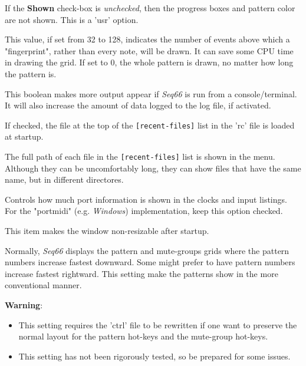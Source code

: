    If the \textbf{Shown} check-box
   is \textsl{unchecked}, then the progress boxes and pattern color are not
   shown.
   This is a 'usr' option.

   This value, if set from 32 to 128, indicates the number of events above
   which a "fingerprint", rather than every note, will be drawn.  It can
   save some CPU time in drawing the grid.  If set to 0, the whole
   pattern is drawn, no matter how long the pattern is.

   This boolean makes more output appear if \textsl{Seq66} is run from a
   console/terminal. It will also increase the amount of data logged to the log
   file, if activated.

   If checked, the file at the top of the \texttt{[recent-files]}
   list in the 'rc' file is loaded at startup.

   The full path of each file in the \texttt{[recent-files]} list
   is shown in the menu.  Although they can be uncomfortably long, they can
   show files that have the same name, but in different directores.

   Controls how much port information is shown in the clocks and input
   listings.  For the "portmidi" (e.g. \textsl{Windows})
   implementation, keep this option checked.

   This item makes the window non-resizable after startup.

   Normally, \textsl{Seq66} displays the pattern and mute-groups grids
   where the pattern numbers increase fastest downward.
   Some might prefer to have pattern numbers increase fastest rightward.
   This setting make the patterns show in the more conventional manner.

   \textbf{Warning}:

      \begin{itemize}
         \item This setting requires the 'ctrl' file to be rewritten
            if one want to preserve the normal layout for the pattern hot-keys
            and the mute-group hot-keys.
         \item This setting has not been rigorously tested, so be prepared for
            some issues.
      \end{itemize}

